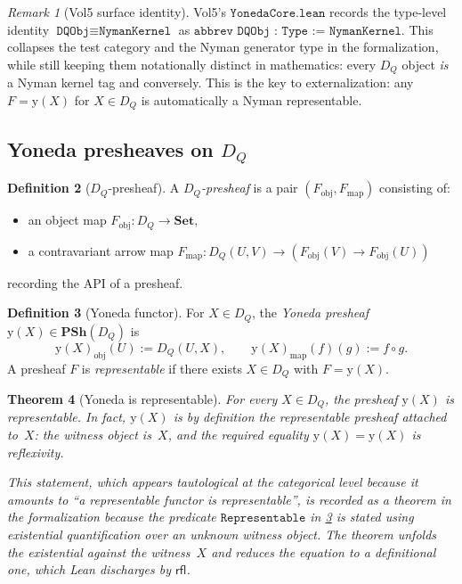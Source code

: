 \documentclass[12pt]{article}
\theoremstyle{plain}
\newtheorem{theorem}{Theorem}[section]
\theoremstyle{definition}
\newtheorem{definition}[theorem]{Definition}
\theoremstyle{remark}
\newtheorem{remark}[theorem]{Remark}
\newcommand{\Yon}{\mathrm{y}}
\newcommand{\PSh}{\mathbf{PSh}}
\newcommand{\Set}{\mathbf{Set}}
\newcommand{\DQ}{D_{Q}}
\begin{document}
\begin{remark}[Vol5 surface identity]
Vol5's $\texttt{YonedaCore.lean}$ records the type-level identity
$\texttt{DQObj}\equiv\texttt{NymanKernel}$ as
$\texttt{abbrev DQObj : Type := NymanKernel}$.  This collapses the test
category and the Nyman generator type in the formalization, while still
keeping them notationally distinct in mathematics: every $D_Q$ object
\emph{is} a Nyman kernel tag and conversely.  This is the key to
externalization: any $F = \Yon(X)$ for $X\in\DQ$ is automatically a
Nyman representable.
\end{remark}

\subsection{Yoneda presheaves on $\DQ$}

\begin{definition}[$\DQ$-presheaf]
\label{def:dqpresheaf}
A \emph{$\DQ$-presheaf} is a pair $(F_{\mathrm{obj}},F_{\mathrm{map}})$
consisting of:
\begin{itemize}
  \item an object map $F_{\mathrm{obj}}\colon \DQ\to\Set$,
  \item a contravariant arrow map $F_{\mathrm{map}}\colon
    \DQ(U,V)\to(F_{\mathrm{obj}}(V)\to F_{\mathrm{obj}}(U))$
\end{itemize}
recording the API of a presheaf.
\end{definition}

\begin{definition}[Yoneda functor]
\label{def:yoneda}
For $X\in\DQ$, the \emph{Yoneda presheaf} $\Yon(X)\in\PSh(\DQ)$ is
\[
  \Yon(X)_{\mathrm{obj}}(U) := \DQ(U,X),\qquad
  \Yon(X)_{\mathrm{map}}(f)(g) := f\circ g.
\]
A presheaf $F$ is \emph{representable} if there exists $X\in\DQ$ with
$F = \Yon(X)$.
\end{definition}

\begin{theorem}[Yoneda is representable]
\label{thm:yoneda-rep}
For every $X\in\DQ$, the presheaf $\Yon(X)$ is representable.  In
fact, $\Yon(X)$ is \emph{by definition} the representable presheaf
attached to~$X$: the witness object is~$X$, and the required equality
$\Yon(X) = \Yon(X)$ is reflexivity.

This statement, which appears tautological at the categorical level
because it amounts to ``a representable functor is representable'',
is recorded as a theorem in the formalization because the predicate
$\texttt{Representable}$ in \cref{def:yoneda} is stated using
existential quantification over an unknown witness object.  The
theorem unfolds the existential against the witness~$X$ and reduces
the equation to a definitional one, which Lean discharges by
$\mathsf{rfl}$.
\end{theorem}
\end{document}
